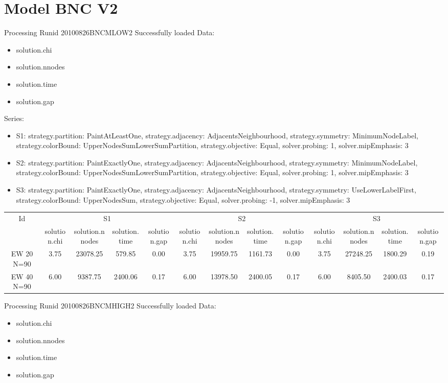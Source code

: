 \documentclass[landscape, 12pt]{report}
\begin{document}
	\section{Model BNC V2}
Processing Runid 20100826BNCMLOW2
 Successfully loaded
Data:
\begin{itemize}
\item solution.chi
\item solution.nnodes
\item solution.time
\item solution.gap
\end{itemize}
Series:
\begin{itemize}
\item S1: strategy.partition: PaintAtLeastOne, strategy.adjacency: AdjacentsNeighbourhood, strategy.symmetry: MinimumNodeLabel, strategy.colorBound: UpperNodesSumLowerSumPartition, strategy.objective: Equal, solver.probing: 1, solver.mipEmphasis: 3
\item S2: strategy.partition: PaintExactlyOne, strategy.adjacency: AdjacentsNeighbourhood, strategy.symmetry: MinimumNodeLabel, strategy.colorBound: UpperNodesSumLowerSumPartition, strategy.objective: Equal, solver.probing: 1, solver.mipEmphasis: 3
\item S3: strategy.partition: PaintExactlyOne, strategy.adjacency: AdjacentsNeighbourhood, strategy.symmetry: UseLowerLabelFirst, strategy.colorBound: UpperNodesSum, strategy.objective: Equal, solver.probing: -1, solver.mipEmphasis: 3
\end{itemize}
\begin{tabular}{|c|cccc|cccc|cccc|}
\hline
\multicolumn{1}{|c|}{Id} & \multicolumn{4}{|c|}{S1} & \multicolumn{4}{|c|}{S2} & \multicolumn{4}{|c|}{S3}
\\
 & solution.chi & solution.nnodes & solution.time & solution.gap & solution.chi & solution.nnodes & solution.time & solution.gap & solution.chi & solution.nnodes & solution.time & solution.gap
\\
\hline
EW 20 N=90 & 3.75 & 23078.25 & 579.85 & 0.00 & 3.75 & 19959.75 & 1161.73 & 0.00 & 3.75 & 27248.25 & 1800.29 & 0.19
\\
EW 40 N=90 & 6.00 & 9387.75 & 2400.06 & 0.17 & 6.00 & 13978.50 & 2400.05 & 0.17 & 6.00 & 8405.50 & 2400.03 & 0.17
\\
\hline 
 \end{tabular}
Processing Runid 20100826BNCMHIGH2
 Successfully loaded
Data:
\begin{itemize}
\item solution.chi
\item solution.nnodes
\item solution.time
\item solution.gap
\end{itemize}
\end{document}
